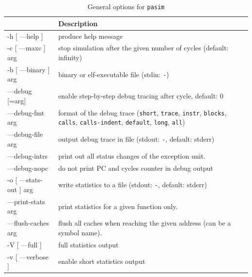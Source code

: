 \documentclass[a4paper,fontsize=10pt,twoside,DIV15,BCOR12mm,headinclude=true,footinclude=false,pagesize,bibtotoc]{scrbook}
\begin{document}
\begin{table}[b!]
  \centering
  \caption{General options for \texttt{pasim}}
  \label{tab:pasimopts_gen}
  \begin{tabular}{>{\ttfamily}l<{}p{}}
    \toprule
    \multicolumn{1}{l}{Option} & Description \\
    \midrule
    -h [ ---help ]       & produce help message \\
    -c [ ---maxc ] arg   & stop simulation after the given number of cycles (default: infinity) \\
    -b [ ---binary ] arg & binary or elf-executable file (stdin: \texttt{-}) \\
    ---debug [=arg]      & enable step-by-step debug tracing after cycle, default: 0 \\
    ---debug-fmt arg     & format of the debug trace (\texttt{short}, \texttt{trace}, \texttt{instr}, \texttt{blocks}, \texttt{calls}, \texttt{calls-indent}, \texttt{default}, \texttt{long}, \texttt{all}) \\
    ---debug-file arg    & output debug trace in file (stdout: \texttt{-}, default: stderr) \\
    ---debug-intrs       & print out all status changes of the exception unit. \\
    ---debug-nopc        & do not print PC and cycles counter in debug output \\
    -o [ ---stats-out ] arg & write statistics to a file (stdout: \texttt{-}, default: stderr) \\
    ---print-stats arg   & print statistics for a given function only. \\
    ---flush-caches arg  & flush all caches when reaching the given address (can be a symbol name). \\
    -V [ ---full ]       & full statistics output \\
    -v [ ---verbose ]    & enable short statistics output \\
    \bottomrule
  \end{tabular}
\end{table}
\end{document}
